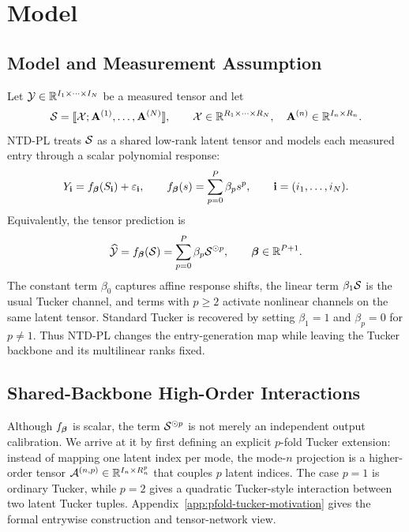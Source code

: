 \section{Model}
\label{sec:model}

\subsection{Model and Measurement Assumption}

Let \(\mathcal{Y} \in \mathbb{R}^{I_1 \times \cdots \times I_N}\) be a measured tensor and let
\begin{equation}
  \mathcal{S} =
  \llbracket \mathcal{X}; \mathbf{A}^{(1)}, \ldots, \mathbf{A}^{(N)} \rrbracket,
  \qquad
  \mathcal{X} \in \mathbb{R}^{R_1 \times \cdots \times R_N},
  \quad
  \mathbf{A}^{(n)} \in \mathbb{R}^{I_n \times R_n}.
\end{equation}
NTD-PL treats \(\mathcal{S}\) as a shared low-rank latent tensor and models each
measured entry through a scalar polynomial response:
\begin{equation}
  Y_{\mathbf i}
  =
  f_{\boldsymbol{\beta}}(S_{\mathbf i})+\varepsilon_{\mathbf i},
  \qquad
  f_{\boldsymbol{\beta}}(s)=\sum_{p=0}^{P}\beta_p s^p,
  \qquad
  \mathbf i=(i_1,\ldots,i_N).
\end{equation}
Equivalently, the tensor prediction is
\begin{equation}
  \widehat{\mathcal{Y}}
  =
  f_{\boldsymbol{\beta}}(\mathcal{S})
  =
  \sum_{p=0}^{P} \beta_p \mathcal{S}^{\odot p},
  \qquad
  \boldsymbol{\beta} \in \mathbb{R}^{P+1}.
\end{equation}
The constant term \(\beta_0\) captures affine response shifts, the linear term
\(\beta_1\mathcal{S}\) is the usual Tucker channel, and terms with \(p\ge2\) activate
nonlinear channels on the same latent tensor. Standard Tucker is recovered by
setting \(\beta_1=1\) and \(\beta_p=0\) for \(p\neq 1\). Thus NTD-PL changes
the entry-generation map while leaving the Tucker backbone and its
multilinear ranks fixed.

\subsection{Shared-Backbone High-Order Interactions}
\label{sec:shared-backbone-interactions}

Although \(f_{\boldsymbol{\beta}}\) is scalar, the term \(\mathcal{S}^{\odot p}\) is not merely an
independent output calibration. We arrive at it by first defining an explicit
\(p\)-fold Tucker extension: instead of mapping one latent index per mode, the
mode-\(n\) projection is a higher-order tensor
\(\mathcal{A}^{(n,p)}\in\mathbb{R}^{I_n\times R_n^p}\) that couples \(p\) latent indices. The
case \(p=1\) is ordinary Tucker, while \(p=2\) gives a quadratic Tucker-style
interaction between two latent Tucker tuples. Appendix~\ref{app:pfold-tucker-motivation}
gives the formal entrywise construction and tensor-network view.

